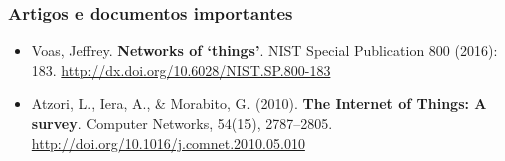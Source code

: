 \documentclass[t]{beamer}
\begin{document}
\begin{frame}
\frametitle{Artigos e documentos importantes}
\begin{itemize}	
	\item Voas, Jeffrey. \textbf{Networks of ‘things’}. NIST Special Publication 800 (2016): 183. \url{http://dx.doi.org/10.6028/NIST.SP.800-183}
	
	\item Atzori, L., Iera, A., \& Morabito, G. (2010). \textbf{The Internet of Things: A survey}. Computer Networks, 54(15), 2787–2805. \url{http://doi.org/10.1016/j.comnet.2010.05.010}
\end{itemize}
\end{frame}

\frame{\titlepage}
\end{document}
